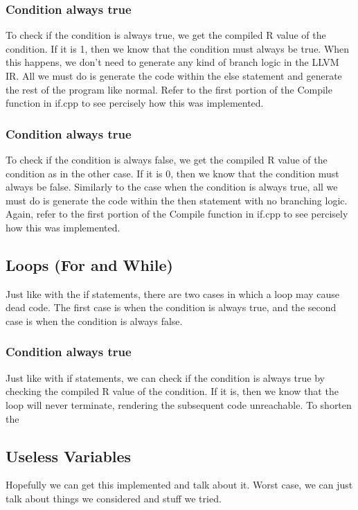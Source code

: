 \documentclass[sigconf]{acmart}
\begin{document}
\subsubsection{Condition always true}
To check if the condition is always true, we get the compiled R value of the condition. If it is 1, then we know that 
the condition must always be true. When this happens, we don't need to generate any kind of branch logic in the LLVM IR.
All we must do is generate the code within the else statement and generate the rest of the program like normal. Refer to 
the first portion of the Compile function in if.cpp to see percisely how this was implemented.

\subsubsection{Condition always true}
To check if the condition is always false, we get the compiled R value of the condition as in the other case. If it is 0, then we know that 
the condition must always be false. Similarly to the case when the condition is always true, all we must do is generate the code within 
the then statement with no branching logic. Again, refer to the first portion of the Compile function in if.cpp to see percisely how this was implemented.

\subsection{Loops (For and While)}
Just like with the if statements, there are two cases in which a loop may cause dead code. The first case is when the condition 
is always true, and the second case is when the condition is always false.

\subsubsection{Condition always true}
Just like with if statements, we can check if the condition is always true by checking the compiled R value of the condition.
If it is, then we know that the loop will never terminate, rendering the subsequent code unreachable. To shorten the 

\subsection{Useless Variables}
Hopefully we can get this implemented and talk about it. Worst case, we can just talk about things we considered 
and stuff we tried.
\end{document}
